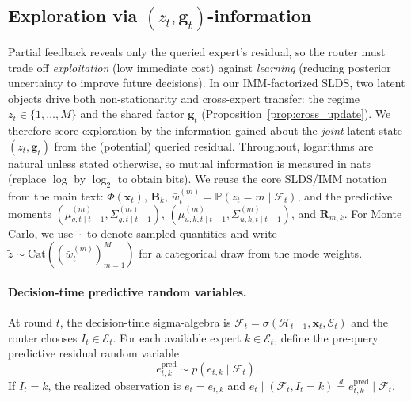 \subsection{Exploration via \((z_t,\mathbf{g}_t)\)-information}
\label{sec:exploration_zg}

Partial feedback reveals only the queried expert's residual, so the router must trade off
\emph{exploitation} (low immediate cost) against \emph{learning} (reducing posterior uncertainty to
improve future decisions).
In our IMM-factorized SLDS, two latent objects drive both non-stationarity and cross-expert transfer:
the regime \(z_t\in\{1,\dots,M\}\) and the shared factor \(\mathbf{g}_t\) (Proposition~\ref{prop:cross_update}).
We therefore score exploration by the information gained about the \emph{joint} latent state
\((z_t,\mathbf{g}_t)\) from the (potential) queried residual.
Throughout, logarithms are natural unless stated otherwise, so mutual information is measured in nats
(replace \(\log\) by \(\log_2\) to obtain bits).
We reuse the core SLDS/IMM notation from the main text: \(\Phi(\mathbf{x}_t)\), \(\mathbf{B}_k\),
\(\bar{w}_t^{(m)}=\mathbb{P}(z_t=m\mid\mathcal{F}_t)\), and the predictive moments
\((\mu^{(m)}_{g,t\mid t-1},\Sigma^{(m)}_{g,t\mid t-1})\), \((\mu^{(m)}_{u,k,t\mid t-1},\Sigma^{(m)}_{u,k,t\mid t-1})\), and \(\mathbf{R}_{m,k}\).
For Monte Carlo, we use \(\tilde{\cdot}\) to denote sampled quantities and write
\(\tilde z\sim \mathrm{Cat}((\bar{w}_t^{(m)})_{m=1}^M)\) for a categorical draw from the mode weights.

\paragraph{Decision-time predictive random variables.}
At round \(t\), the decision-time sigma-algebra is
\(
\mathcal{F}_t=\sigma(\mathcal{H}_{t-1},\mathbf{x}_t,\mathcal{E}_t)
\)
and the router chooses \(I_t\in\mathcal{E}_t\).
For each available expert \(k\in\mathcal{E}_t\), define the pre-query predictive residual random variable
\begin{equation}
\label{eq:exp_pred_rv}
e_{t,k}^{\mathrm{pred}} \sim p(e_{t,k}\mid \mathcal{F}_t).
\end{equation}
If \(I_t=k\), the realized observation is \(e_t=e_{t,k}\) and
\(
e_t \mid (\mathcal{F}_t,I_t=k)\overset{d}{=} e_{t,k}^{\mathrm{pred}}\mid \mathcal{F}_t.
\)

